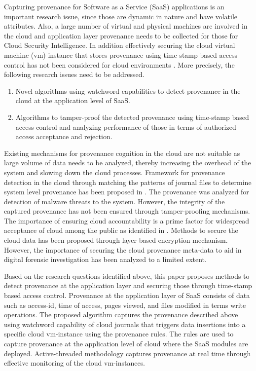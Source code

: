 \documentclass[conference]{IEEEtran}
\begin{document}
Capturing provenance for Software as a Service (SaaS) applications is an important research issue, since those are dynamic in nature and have volatile attributes. Also, a large number of virtual and physical machines are involved in the cloud and application layer provenance needs to be collected for those for Cloud Security Intelligence. In addition effectively securing the cloud virtual machine (vm) instance that stores provenance using time-stamp based access control has not been considered for cloud environments \cite{armbrust2010view}. More precisely, the following research issues need to be addressed.

\begin{enumerate}
\item Novel algorithms using watchword capabilities to detect provenance in the cloud at the application level of SaaS.
\item Algorithms to tamper-proof the detected provenance using time-stamp based access control and analyzing performance of those in terms of authorized access acceptance and rejection.
\end{enumerate}

Existing mechanisms for provenance cognition in the cloud are not suitable as large volume of data needs to be analyzed, thereby increasing the overhead of the system and slowing down the cloud processes. Framework for provenance detection in the cloud through matching the patterns of journal files to determine system level provenance has been proposed in \cite{imran2013provintsec}. The provenance was analyzed for detection of malware threats to the system. However, the integrity of the captured provenance has not been ensured through tamper-proofing mechanisms. The importance of ensuring cloud accountability is a prime factor for widespread acceptance of cloud among the public as identified in \cite{pohly2012hi}. Methods to secure the cloud data has been proposed through layer-based encryption mechanism. However, the importance of securing the cloud provenance meta-data to aid in digital forensic investigation has been analyzed to a limited extent.

Based on the research questions identified above, this paper proposes methods to detect provenance at the application layer and securing those through time-stamp based access control. Provenance at the application layer of SaaS consists of data such as access-id, time of access, pages viewed, and files modified in terms write operations. The proposed algorithm captures the provenance described above using watchword capability of cloud journals that triggers data insertions into a specific cloud vm-instance using the provenance rules. The rules are used to capture provenance at the application level of cloud where the SaaS modules are deployed. Active-threaded methodology captures provenance at real time through effective monitoring of the cloud vm-instances.
\end{document}

